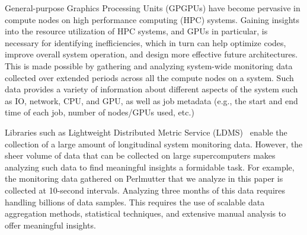 General-purpose Graphics Processing Units (GPGPUs) have become pervasive in
compute nodes on high performance computing (HPC) systems. Gaining insights
into the resource utilization of HPC systems, and GPUs in particular, is
necessary for identifying inefficiencies, which in turn can help optimize
codes, improve overall system operation, and design more effective future
architectures. This is made possible by gathering and analyzing system-wide
monitoring data collected over extended periods across all the compute nodes on
a system. Such data provides a variety of information about different aspects
of the system such as IO, network, CPU, and GPU, as well as job metadata (e.g.,
the start and end time of each job, number of nodes/GPUs used, etc.)

Libraries such as  Lightweight Distributed Metric Service (LDMS)~\cite{ldms} enable
the collection of a large amount of longitudinal system monitoring data.
However, the sheer volume of data that can be collected on large supercomputers
makes analyzing such data to find meaningful insights a formidable task.  For
example, the monitoring data gathered on Perlmutter that we analyze in this
paper is collected at 10-second intervals. Analyzing three months of this data
requires handling billions of data samples.  This requires the use of scalable
data aggregation methods, statistical techniques, and extensive manual analysis
to offer meaningful insights.


